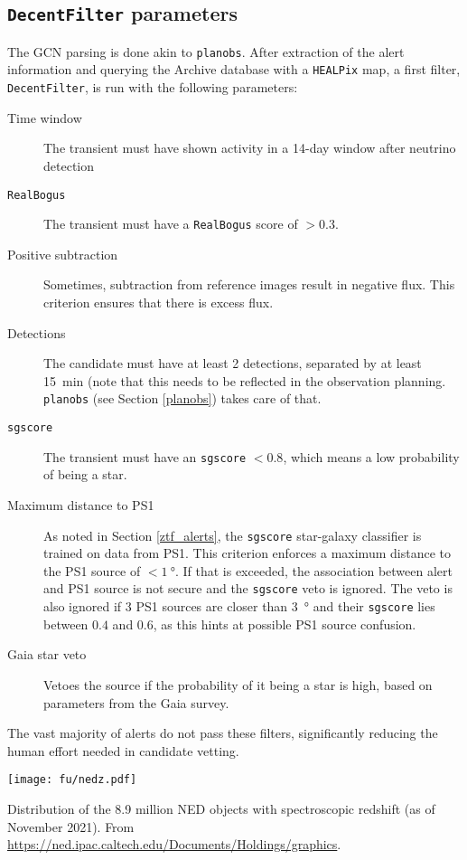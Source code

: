 \subsection{\texttt{DecentFilter} parameters}
The GCN parsing is done akin to \texttt{planobs}. After extraction of the alert information and querying the Archive database with a \texttt{HEALPix} map, a first filter, \texttt{DecentFilter}, is run with the following parameters:
\begin{description}
    \item[Time window] The transient must have shown activity in a 14-day window after neutrino detection
    \item[\texttt{RealBogus}] The transient must have a \texttt{RealBogus} score of $>0.3$.
    \item[Positive subtraction] Sometimes, subtraction from reference images result in negative flux. This criterion ensures that there is excess flux.
    \item[Detections] The candidate must have at least 2 detections, separated by at least \SI{15}{\minute} (note that this needs to be reflected in the observation planning. \texttt{planobs} (see Section \ref{planobs}) takes care of that.
    \item[\texttt{sgscore}] The transient must have an \texttt{sgscore} $<0.8$, which means a low probability of being a star.
    \item[Maximum distance to PS1] As noted in Section \ref{ztf_alerts}, the \texttt{sgscore} star-galaxy classifier is trained on data from PS1. This criterion enforces a maximum distance to the PS1 source of $<\SI{1}{\degree}$. If that is exceeded, the association between alert and PS1 source is not secure and the \texttt{sgscore} veto is ignored. The veto is also ignored if 3 PS1 sources are closer than \SI{3}{\degree} and their \texttt{sgscore} lies between $0.4$ and $0.6$, as this hints at possible PS1 source confusion.
    \item[Gaia star veto] Vetoes the source if the probability of it being a star is high, based on parameters from the Gaia survey.
\end{description}
The vast majority of alerts do not pass these filters, significantly reducing the human effort needed in candidate vetting.
\begin{marginfigure}
    \texttt{[image: fu/nedz.pdf]}
    \caption[NED spectroscopic redshift distribution]{Distribution of the 8.9 million NED objects with spectroscopic redshift (as of November 2021). From \url{https://ned.ipac.caltech.edu/Documents/Holdings/graphics}.}
\end{marginfigure} 
